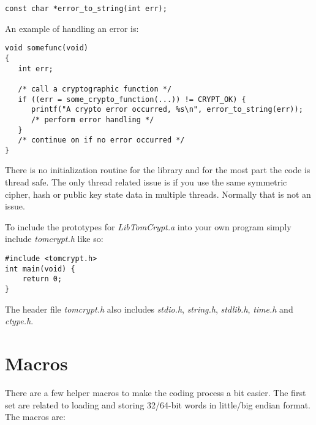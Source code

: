 \documentclass[synpaper]{book}
\newcommand{\mysection}[1]    %
	{                   %
	\section{#1}
   \markboth{\textsf{www.libtom.org}}{\thesection ~ {#1}}
	}
\begin{document}
\begin{verbatim}
const char *error_to_string(int err);
\end{verbatim}

An example of handling an error is:
\begin{small}
\begin{verbatim}
void somefunc(void)
{
   int err;

   /* call a cryptographic function */
   if ((err = some_crypto_function(...)) != CRYPT_OK) {
      printf("A crypto error occurred, %s\n", error_to_string(err));
      /* perform error handling */
   }
   /* continue on if no error occurred */
}
\end{verbatim}
\end{small}

There is no initialization routine for the library and for the most part the code is thread safe.  The only thread
related issue is if you use the same symmetric cipher, hash or public key state data in multiple threads.  Normally
that is not an issue.

To include the prototypes for \textit{LibTomCrypt.a} into your own program simply include \textit{tomcrypt.h} like so:
\begin{small}
\begin{verbatim}
#include <tomcrypt.h>
int main(void) {
    return 0;
}
\end{verbatim}
\end{small}

The header file \textit{tomcrypt.h} also includes \textit{stdio.h}, \textit{string.h}, \textit{stdlib.h}, \textit{time.h} and \textit{ctype.h}.

\mysection{Macros}

There are a few helper macros to make the coding process a bit easier.  The first set are related to loading and storing
32/64-bit words in little/big endian format.  The macros are:
\end{document}
